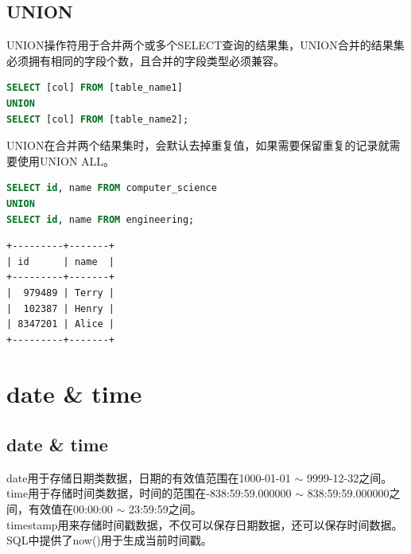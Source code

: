 \documentclass[12pt, openany, oneside]{book}
\begin{document}
\section{UNION}

UNION操作符用于合并两个或多个SELECT查询的结果集，UNION合并的结果集必须拥有相同的字段个数，且合并的字段类型必须兼容。

\vspace{-0.5cm}

\begin{lstlisting}[language=SQL]
SELECT [col] FROM [table_name1]
UNION
SELECT [col] FROM [table_name2];
\end{lstlisting}

UNION在合并两个结果集时，会默认去掉重复值，如果需要保留重复的记录就需要使用UNION ALL。 \\


\begin{lstlisting}[language=SQL]
SELECT id, name FROM computer_science
UNION
SELECT id, name FROM engineering;
\end{lstlisting}

\begin{tcolorbox}
    \begin{verbatim}
+---------+-------+
| id      | name  |
+---------+-------+
|  979489 | Terry |
|  102387 | Henry |
| 8347201 | Alice |
+---------+-------+
    \end{verbatim}
\end{tcolorbox}

\newpage

\chapter{date \& time}

\section{date \& time}

date用于存储日期类数据，日期的有效值范围在1000-01-01 $ \sim $ 9999-12-32之间。 \\

time用于存储时间类数据，时间的范围在-838:59:59.000000 $ \sim $ 838:59:59.000000之间，有效值在00:00:00 $ \sim $ 23:59:59之间。 \\

timestamp用来存储时间戳数据，不仅可以保存日期数据，还可以保存时间数据。SQL中提供了now()用于生成当前时间戳。 \\
\end{document}
